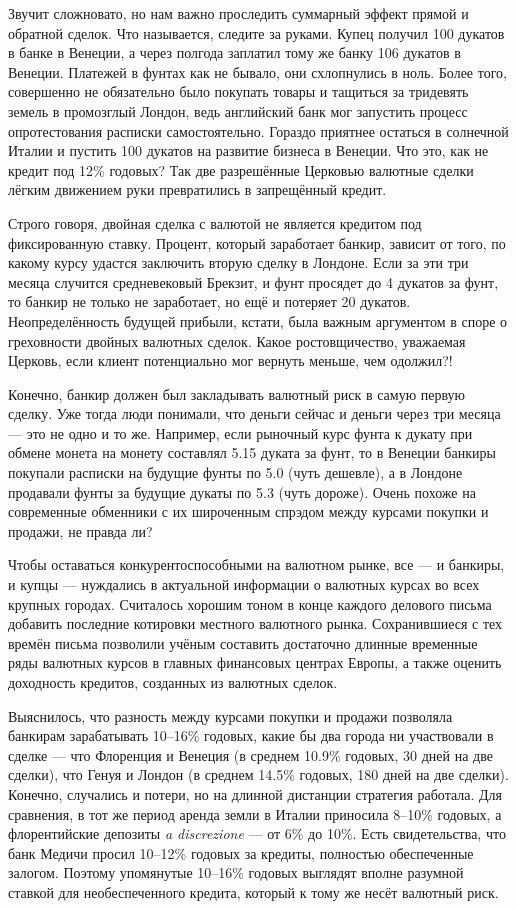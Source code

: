 \documentclass[a4paper,14pt]{extarticle}
\newcommand{\foreign}[1]{\textit{#1}}
\begin{document}
Звучит сложновато, но нам важно проследить суммарный эффект прямой и обратной сделок. Что называется, следите за руками. Купец получил 100 дукатов в банке в Венеции, а через полгода заплатил тому же банку 106 дукатов в Венеции. Платежей в фунтах как не бывало, они схлопнулись в ноль. Более того, совершенно не обязательно было покупать товары и тащиться за тридевять земель в промозглый Лондон, ведь английский банк мог запустить процесс опротестования расписки самостоятельно. Гораздо приятнее остаться в солнечной Италии и пустить 100 дукатов на развитие бизнеса в Венеции. Что это, как не кредит под 12\% годовых? Так две разрешённые Церковью валютные сделки лёгким движением руки превратились в запрещённый кредит.

Строго говоря, двойная сделка с валютой не является кредитом под фиксированную ставку. Процент, который заработает банкир, зависит от того, по какому курсу удастся заключить вторую сделку в Лондоне. Если за эти три месяца случится средневековый Брекзит, и фунт просядет до 4 дукатов за фунт, то банкир не только не заработает, но ещё и потеряет 20 дукатов. Неопределённость будущей прибыли, кстати, была важным аргументом в споре о греховности двойных валютных сделок. Какое ростовщичество, уважаемая Церковь, если клиент потенциально мог вернуть меньше, чем одолжил?!

Конечно, банкир должен был закладывать валютный риск в самую первую сделку. Уже тогда люди понимали, что деньги сейчас и деньги через три месяца --- это не одно и то же. Например, если рыночный курс фунта к дукату при обмене монета на монету составлял \num{5.15} дуката за фунт, то в Венеции банкиры покупали расписки на будущие фунты по \num{5.0} (чуть дешевле), а в Лондоне продавали фунты за будущие дукаты по \num{5.3} (чуть дороже). Очень похоже на современные обменники с их широченным спрэдом между курсами покупки и продажи, не правда ли?

Чтобы оставаться конкурентоспособными на валютном рынке, все --- и банкиры, и купцы --- нуждались в актуальной информации о валютных курсах во всех крупных городах. Считалось хорошим тоном в конце каждого делового письма добавить последние котировки местного валютного рынка. Сохранившиеся с тех времён письма позволили учёным составить достаточно длинные временные ряды валютных курсов в главных финансовых центрах Европы, а также оценить доходность кредитов, созданных из валютных сделок.

Выяснилось, что разность между курсами покупки и продажи позволяла банкирам зарабатывать 10--16\% годовых, какие бы два города ни участвовали в сделке --- что Флоренция и Венеция (в среднем \num{10.9}\% годовых, 30 дней на две сделки), что Генуя и Лондон (в среднем \num{14.5}\% годовых, 180 дней на две сделки). Конечно, случались и потери, но на длинной дистанции стратегия работала. Для сравнения, в тот же период аренда земли в Италии приносила 8--10\% годовых, а флорентийские депозиты \foreign{a discrezione} --- от 6\% до 10\%. Есть свидетельства, что банк Медичи просил 10--12\% годовых за кредиты, полностью обеспеченные залогом. Поэтому упомянутые 10--16\% годовых выглядят вполне разумной ставкой для необеспеченного кредита, который к тому же несёт валютный риск.
\end{document}
